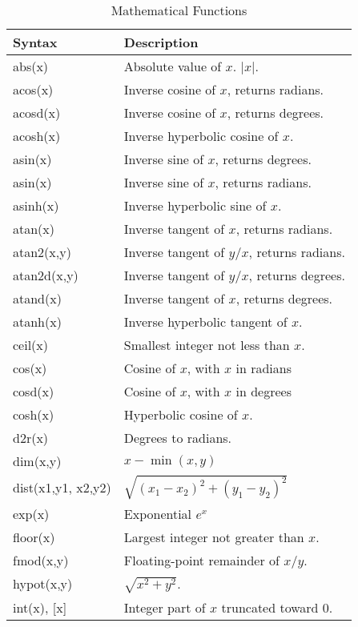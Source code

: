 \begin{longtable}{lp{4.0in}}
\caption{Mathematical Functions}\label{t:functions}\\
Syntax              & Description \\
\hline
\endhead
abs(x)              &  Absolute value of $x$. $|x|$.\\
acos(x)             &  Inverse cosine of $x$, returns radians.\\
acosd(x)            &  Inverse cosine of $x$, returns degrees.\\
acosh(x)            &  Inverse hyperbolic cosine of $x$.\\
asin(x)             &  Inverse sine of $x$, returns degrees.\\
asin(x)             &  Inverse sine of $x$, returns radians.\\
asinh(x)            &  Inverse hyperbolic sine of $x$.\\
atan(x)             &  Inverse tangent of $x$, returns radians.\\
atan2(x,y)          &  Inverse tangent of $y/x$, returns radians.\\
atan2d(x,y)         &  Inverse tangent of $y/x$, returns degrees.\\
atand(x)            &  Inverse tangent of $x$, returns degrees.\\
atanh(x)            &  Inverse hyperbolic tangent of $x$.\\
ceil(x)             &  Smallest integer not less than $x$.\\
cos(x)              &  Cosine of $x$, with $x$ in radians\\
cosd(x)             &  Cosine of $x$, with $x$ in degrees\\
cosh(x)             &  Hyperbolic cosine of $x$.\\
d2r(x)              &  Degrees to radians.\\
dim(x,y)            &  $x - \min(x,y)$\\
dist(x1,y1, x2,y2)  &  $\sqrt{(x_1-x_2)^2 + (y_1-y_2)^2}$ \\
exp(x)              &  Exponential  $e^x$ \\
floor(x)            &  Largest integer not greater than $x$.\\
fmod(x,y)           &  Floating-point remainder of $x/y$.\\
hypot(x,y)          &  $\sqrt{x^2+y^2}$.\\
int(x), [x]         &  Integer part of $x$ truncated toward 0.\\

\end{longtable}
